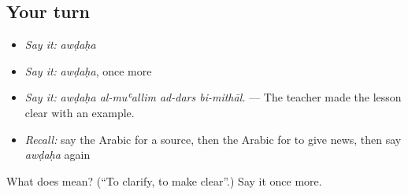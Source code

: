 \subsection*{Your turn}
\begin{itemize}
\raggedright
  \item \emph{Say it:} \emph{awḍaḥa}
  \item \emph{Say it:} \emph{awḍaḥa}, once more
  \item \emph{Say it:} \emph{awḍaḥa al-muʿallim ad-dars bi-mithāl.} — The teacher made the lesson clear with an example.
  \item \emph{Recall:} say the Arabic for a source, then the Arabic for to give news, then say \emph{awḍaḥa} again
\end{itemize}

\begin{tcolorbox}[breakable,colback=teal!4,colframe=teal!35!black,title={Before you move on}]
What does  mean? (\textquotedblleft{}To clarify, to make clear\textquotedblright{}.) Say it once more.
\end{tcolorbox}
